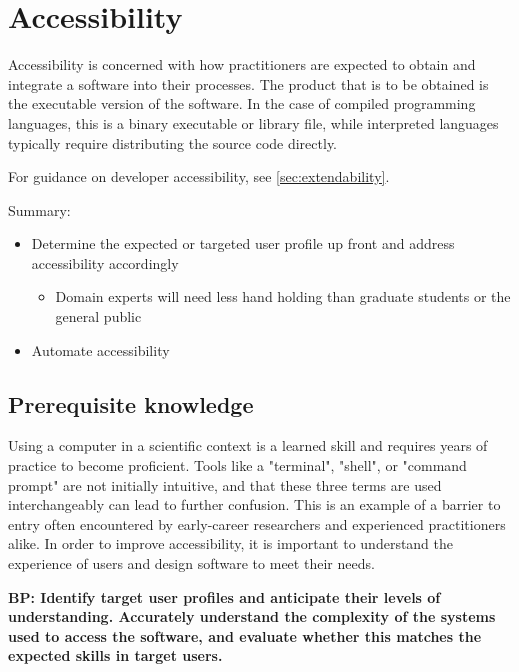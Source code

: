 \documentclass[]{nrel}
\begin{document}
\chapter{Accessibility}
Accessibility is concerned with how practitioners are expected to obtain and integrate a software
into their processes. The product that is to be obtained is the executable version of the software.
In the case of compiled programming languages, this is a binary executable or library file,
while interpreted languages typically require distributing the source code directly.

For guidance on developer accessibility, see \ref{sec:extendability}.

Summary:
\begin{itemize}
\item Determine the expected or targeted user profile up front and address accessibility accordingly
\begin{itemize}
\item Domain experts will need less hand holding than graduate students or the general public

\end{itemize}

\item Automate accessibility

\end{itemize}


\section{Prerequisite knowledge}
Using a computer in a scientific context is a learned skill and requires years of practice to
become proficient. Tools like a "terminal", "shell", or "command prompt" are not initially
intuitive, and that these three terms are used interchangeably can lead to further confusion.
This is an example of a barrier to entry often encountered by early-career researchers and
experienced practitioners alike. In order to improve accessibility, it is important to
understand the experience of users and design software to meet their needs.

\textbf{BP: Identify target user profiles and anticipate their levels of understanding. Accurately
understand the complexity of the systems used to access the software, and evaluate whether
this matches the expected skills in target users.}
\end{document}
